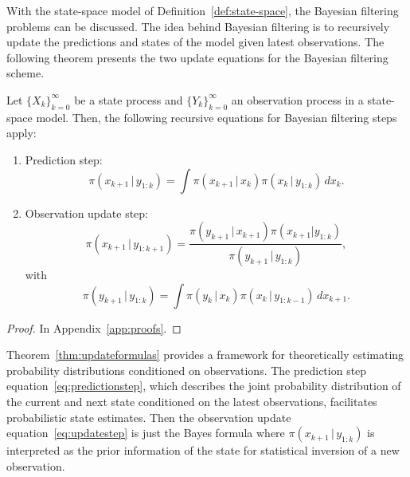 With the state-space model of Definition~\ref{def:state-space}, the Bayesian filtering problems can be discussed.
The idea behind Bayesian filtering is to recursively update the predictions and states of the model given latest observations.
The following theorem presents the two update equations for the Bayesian filtering scheme.
\begin{theorem}\label{thm:updateformulas}
    Let $\{X_k\}_{k=0}^{\infty}$ be a state process and $\{Y_k\}_{k=0}^{\infty}$ an observation process in a state-space model.
    Then, the following recursive equations for Bayesian filtering steps apply:
    \begin{enumerate}
        \item 
            Prediction step:
            \begin{equation}\label{eq:predictionstep}
                \pi (x_{k+1} \, \vert \, y_{1:k}) = \int \pi (x_{k+1} \, \vert \, x_k) \pi (x_k \, \vert \, y_{1:k}) \, d x_k.
            \end{equation}
        \item
            Observation update step:
            \begin{equation}\label{eq:updatestep}
                \pi(x_{k+1} \, \vert \, y_{1:k+1}) = \frac{\pi (y_{k+1} \, \vert \, x_{k+1}) \pi (x_{k+1} | y_{1:k})}{\pi (y_{k+1} \, \vert \, y_{1:k})},
            \end{equation}
            with
            \begin{equation*}
                \pi (y_{k+1} \, \vert \, y_{1:k}) = \int \pi (y_k \, \vert \, x_k) \pi (x_k \, \vert \, y_{1:k-1}) \, d x_{k+1}.
            \end{equation*}
    \end{enumerate}
\end{theorem}
\begin{proof}
    In Appendix~\ref{app:proofs}.
\end{proof}

Theorem~\ref{thm:updateformulas} provides a framework for theoretically estimating probability distributions conditioned on observations.
The prediction step equation~\ref{eq:predictionstep}, which describes the joint probability distribution of the current and next state conditioned on the latest observations, facilitates probabilistic state estimates.
Then the observation update equation~\ref{eq:updatestep} is just the Bayes formula where $\pi (x_{k+1} \, \vert \, y_{1:k})$ is interpreted as the prior information of the state for statistical inversion of a new observation.

